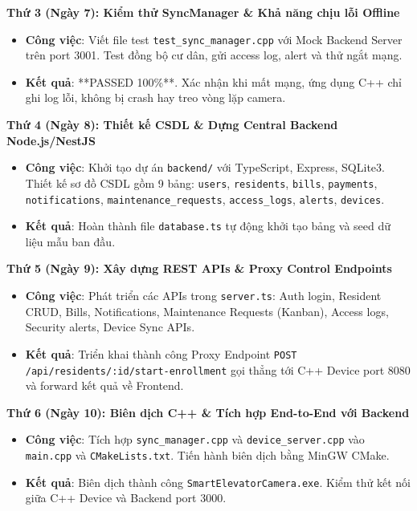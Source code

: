\documentclass[12pt,a4paper]{article}
\begin{document}
\begin{daybox}
\textbf{Thứ 3 (Ngày 7): Kiểm thử SyncManager \& Khả năng chịu lỗi Offline}
\begin{itemize}[leftmargin=*]
    \item \textbf{Công việc}: Viết file test \texttt{test\_sync\_manager.cpp} với Mock Backend Server trên port 3001. Test đồng bộ cư dân, gửi access log, alert và thử ngắt mạng.
    \item \textbf{Kết quả}: **PASSED 100\%**. Xác nhận khi mất mạng, ứng dụng C++ chỉ ghi log lỗi, không bị crash hay treo vòng lặp camera.
\end{itemize}
\end{daybox}

\begin{daybox}
\textbf{Thứ 4 (Ngày 8): Thiết kế CSDL \& Dựng Central Backend Node.js/NestJS}
\begin{itemize}[leftmargin=*]
    \item \textbf{Công việc}: Khởi tạo dự án \texttt{backend/} với TypeScript, Express, SQLite3. Thiết kế sơ đồ CSDL gồm 9 bảng: \texttt{users}, \texttt{residents}, \texttt{bills}, \texttt{payments}, \texttt{notifications}, \texttt{maintenance\_requests}, \texttt{access\_logs}, \texttt{alerts}, \texttt{devices}.
    \item \textbf{Kết quả}: Hoàn thành file \texttt{database.ts} tự động khởi tạo bảng và seed dữ liệu mẫu ban đầu.
\end{itemize}
\end{daybox}

\begin{daybox}
\textbf{Thứ 5 (Ngày 9): Xây dựng REST APIs \& Proxy Control Endpoints}
\begin{itemize}[leftmargin=*]
    \item \textbf{Công việc}: Phát triển các APIs trong \texttt{server.ts}: Auth login, Resident CRUD, Bills, Notifications, Maintenance Requests (Kanban), Access logs, Security alerts, Device Sync APIs.
    \item \textbf{Kết quả}: Triển khai thành công Proxy Endpoint \texttt{POST /api/residents/:id/start-enrollment} gọi thẳng tới C++ Device port 8080 và forward kết quả về Frontend.
\end{itemize}
\end{daybox}

\begin{daybox}
\textbf{Thứ 6 (Ngày 10): Biên dịch C++ \& Tích hợp End-to-End với Backend}
\begin{itemize}[leftmargin=*]
    \item \textbf{Công việc}: Tích hợp \texttt{sync\_manager.cpp} và \texttt{device\_server.cpp} vào \texttt{main.cpp} và \texttt{CMakeLists.txt}. Tiến hành biên dịch bằng MinGW CMake.
    \item \textbf{Kết quả}: Biên dịch thành công \texttt{SmartElevatorCamera.exe}. Kiểm thử kết nối giữa C++ Device và Backend port 3000.
\end{itemize}
\end{daybox}
\end{document}
